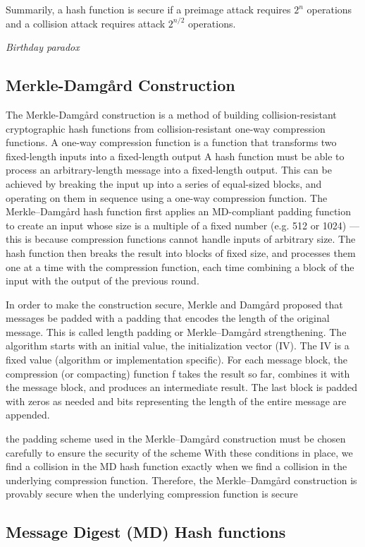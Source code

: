 \documentclass{article}
\theoremstyle{quest}
\begin{document}
Summarily, a hash function is secure if
a preimage attack requires $2^n$ operations and
a collision attack requires attack $2^{n/2}$ operations.

\textit{Birthday paradox}

\subsection{Merkle-Damg\aa rd Construction}
The Merkle-Damg\aa rd construction is 
a method of building collision-resistant cryptographic hash functions 
from collision-resistant one-way compression functions.
A one-way compression function is a function
that transforms two fixed-length inputs into a fixed-length output
A hash function must be able to process an arbitrary-length message into a fixed-length output.
This can be achieved by breaking the input up into a series of equal-sized blocks,
and operating on them in sequence using a one-way compression function.
The Merkle–Damgård hash function first applies an MD-compliant padding function to create an input whose size is a multiple of a fixed number (e.g. 512 or 1024) — this is because compression functions cannot handle inputs of arbitrary size. The hash function then breaks the result into blocks of fixed size, and processes them one at a time with the compression function, each time combining a block of the input with the output of the previous round.

In order to make the construction secure, Merkle and Damgård proposed that messages be padded with a padding that encodes the length of the original message. This is called length padding or Merkle–Damgård strengthening.
The algorithm starts with an initial value, the initialization vector (IV). The IV is a fixed value (algorithm or implementation specific). For each message block, the compression (or compacting) function f takes the result so far, combines it with the message block, and produces an intermediate result. The last block is padded with zeros as needed and bits representing the length of the entire message are appended.

the padding scheme used in the Merkle–Damgård construction must be chosen carefully to ensure the security of the scheme
With these conditions in place, we find a collision in the MD hash function exactly when we find a collision in the underlying compression function. Therefore, the Merkle–Damgård construction is provably secure when the underlying compression function is secure


\subsection{Message Digest (MD) Hash functions}
\end{document}
